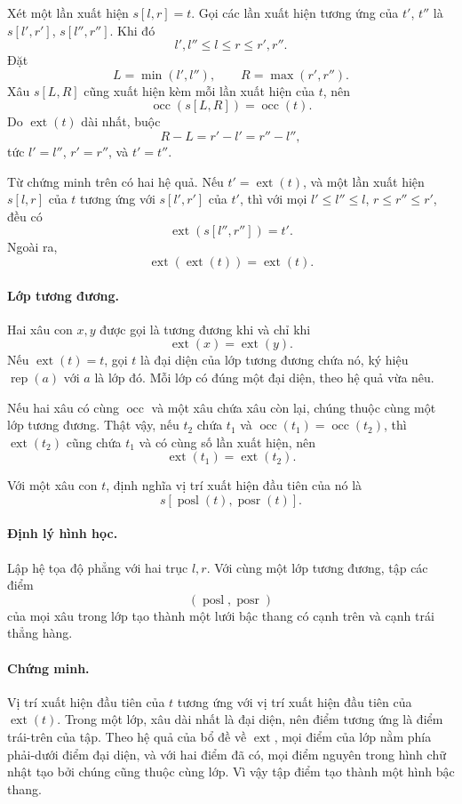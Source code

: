 \documentclass[11pt]{article}
\begin{document}
Xét một lần xuất hiện \(s[l,r]=t\). Gọi các lần xuất hiện tương ứng của
\(t'\), \(t''\) là \(s[l',r']\), \(s[l'',r'']\). Khi đó
\[
  l',l''\le l\le r\le r',r''.
\]
Đặt
\[
  L=\min(l',l''),\qquad R=\max(r',r'').
\]
Xâu \(s[L,R]\) cũng xuất hiện kèm mỗi lần xuất hiện của \(t\), nên
\[
  \operatorname{occ}(s[L,R])=\operatorname{occ}(t).
\]
Do \(\operatorname{ext}(t)\) dài nhất, buộc
\[
  R-L=r'-l'=r''-l'',
\]
tức \(l'=l''\), \(r'=r''\), và \(t'=t''\).

Từ chứng minh trên có hai hệ quả. Nếu \(t'=\operatorname{ext}(t)\), và một lần
xuất hiện \(s[l,r]\) của \(t\) tương ứng với \(s[l',r']\) của \(t'\), thì với
mọi \(l'\le l''\le l\), \(r\le r''\le r'\), đều có
\[
  \operatorname{ext}(s[l'',r''])=t'.
\]
Ngoài ra,
\[
  \operatorname{ext}(\operatorname{ext}(t))=\operatorname{ext}(t).
\]

\paragraph{Lớp tương đương.}
Hai xâu con \(x,y\) được gọi là tương đương khi và chỉ khi
\[
  \operatorname{ext}(x)=\operatorname{ext}(y).
\]
Nếu \(\operatorname{ext}(t)=t\), gọi \(t\) là đại diện của lớp tương đương chứa
nó, ký hiệu \(\operatorname{rep}(a)\) với \(a\) là lớp đó. Mỗi lớp có đúng một
đại diện, theo hệ quả vừa nêu.

Nếu hai xâu có cùng \(\operatorname{occ}\) và một xâu chứa xâu còn lại, chúng
thuộc cùng một lớp tương đương. Thật vậy, nếu \(t_2\) chứa \(t_1\) và
\(\operatorname{occ}(t_1)=\operatorname{occ}(t_2)\), thì
\(\operatorname{ext}(t_2)\) cũng chứa \(t_1\) và có cùng số lần xuất hiện, nên
\[
  \operatorname{ext}(t_1)=\operatorname{ext}(t_2).
\]

Với một xâu con \(t\), định nghĩa vị trí xuất hiện đầu tiên của nó là
\[
  s[\operatorname{posl}(t),\operatorname{posr}(t)].
\]

\paragraph{Định lý hình học.}
Lập hệ tọa độ phẳng với hai trục \(l,r\). Với cùng một lớp tương đương, tập
các điểm
\[
  (\operatorname{posl},\operatorname{posr})
\]
của mọi xâu trong lớp tạo thành một lưới bậc thang có cạnh trên và cạnh trái
thẳng hàng.

\paragraph{Chứng minh.}
Vị trí xuất hiện đầu tiên của \(t\) tương ứng với vị trí xuất hiện đầu tiên của
\(\operatorname{ext}(t)\). Trong một lớp, xâu dài nhất là đại diện, nên điểm
tương ứng là điểm trái-trên của tập. Theo hệ quả của bổ đề về \(\operatorname{ext}\),
mọi điểm của lớp nằm phía phải-dưới điểm đại diện, và với hai điểm đã có, mọi
điểm nguyên trong hình chữ nhật tạo bởi chúng cũng thuộc cùng lớp. Vì vậy tập
điểm tạo thành một hình bậc thang.
\end{document}
